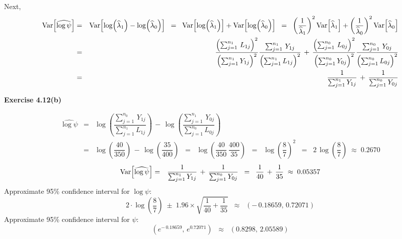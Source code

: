 Next,
\begin{eqnarray*}
\textnormal{Var}\!\left[\widehat{\log\psi}\right]
&=& \textnormal{Var}\!\left[\log\!\left(\widehat{\lambda}_{1}\right) - \log\!\left(\widehat{\lambda}_{0}\right)\right]
\;\;=\;\; \textnormal{Var}\!\left[\log\!\left(\widehat{\lambda}_{1}\right)\right] + \textnormal{Var}\!\left[\log\!\left(\widehat{\lambda}_{0}\right)\right]
\;\;=\;\; \left(\dfrac{1}{\widehat{\lambda}_{1}}\right)^{2}\textnormal{Var}\!\left[\widehat{\lambda}_{1}\right]
+ \left(\dfrac{1}{\widehat{\lambda}_{0}}\right)^{2}\textnormal{Var}\!\left[\widehat{\lambda}_{0}\right]
\\
&=&
\dfrac{\left(\sum_{j=1}^{n_{1}}\,L_{1j}\right)^{2}}{\left(\sum_{j=1}^{n_{1}}Y_{1j}\right)^{2}}
\dfrac{\sum_{j=1}^{n_{1}}\,Y_{1j}}{\left(\sum_{j=1}^{n_{1}}L_{1j}\right)^{2}}
\,+\,
\dfrac{\left(\sum_{j=1}^{n_{0}}\,L_{0j}\right)^{2}}{\left(\sum_{j=1}^{n_{0}}Y_{0j}\right)^{2}}
\dfrac{\sum_{j=1}^{n_{0}}\,Y_{0j}}{\left(\sum_{j=1}^{n_{0}}L_{0j}\right)^{2}}
\\
&=&
\dfrac{1}{\sum_{j=1}^{n_{1}}Y_{1j}} \,+\, \dfrac{1}{\sum_{j=1}^{n_{0}}Y_{0j}}
\end{eqnarray*}

\vskip 1.0cm
\noindent
\textbf{Exercise 4.12(b)}

\begin{eqnarray*}
\widehat{\log\psi}
&=& \log\!\left(\dfrac{\sum_{j=1}^{n_{0}}\,Y_{1j}}{\sum_{j=1}^{n_{1}}L_{1j}}\right)
\,-\, \log\!\left(\dfrac{\sum_{j=1}^{n_{1}}\,Y_{0j}}{\sum_{j=1}^{n_{0}}L_{0j}}\right)
\\
&=& \log\!\left(\dfrac{40}{350}\right) \,-\, \log\!\left(\dfrac{35}{400}\right)
\;\;=\;\; \log\!\left(\dfrac{40}{350}\,\dfrac{400}{35}\right)
\;\;=\;\; \log\!\left(\dfrac{8}{7}\right)^{2}
\;\;=\;\; 2\,\log\!\left(\dfrac{8}{7}\right)
\;\approx\; 0.2670
\end{eqnarray*}
\begin{eqnarray*}
\textnormal{Var}\!\left[\widehat{\log\psi}\right]
&=& \dfrac{1}{\sum_{j=1}^{n_{1}}Y_{1j}} \,+\, \dfrac{1}{\sum_{j=1}^{n_{0}}Y_{0j}}
\;\;=\;\; \dfrac{1}{40} \, + \, \dfrac{1}{35}
\;\approx\; 0.05357
\end{eqnarray*}
Approximate 95\% confidence interval for $\log\psi$:
\begin{equation*}
2 \cdot \log\left(\dfrac{8}{7}\right) \;\pm\; 1.96 \times \sqrt{\dfrac{1}{40} + \dfrac{1}{35}} \;\;\approx\;\; (-\,0.18659,\,0.72071)
\end{equation*}
Approximate 95\% confidence interval for $\psi$:
\begin{equation*}
(e^{-\,0.18659},\,e^{0.72071}) \;\;\approx\;\; (0.8298,\,2.05589)
\end{equation*}










